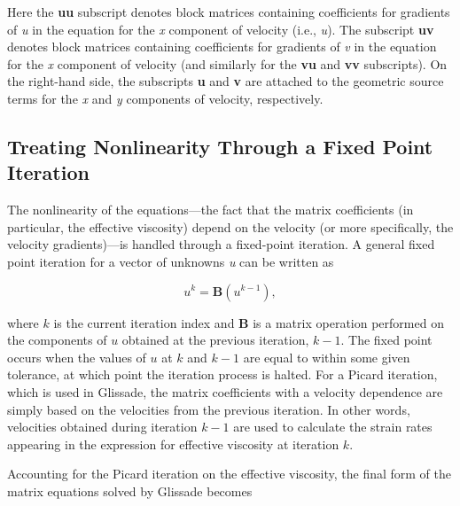 \noindent
Here the \textbf{uu} subscript denotes block matrices containing coefficients for gradients of \textit{u} in the equation for the \textit{x} component of velocity (i.e., \textit{u}). The subscript \textbf{uv} denotes block matrices containing coefficients for gradients of \textit{v} in the equation for the \textit{x} component of velocity (and similarly for the \textbf{vu} and \textbf{vv} subscripts). On the right-hand side, the subscripts \textbf{u} and \textbf{v} are attached to the geometric source terms for the \textit{x} and \textit{y} components of velocity, respectively.

\subsection{Treating Nonlinearity Through a Fixed Point Iteration}
The nonlinearity of the equations---the fact that the matrix coefficients (in particular, the effective viscosity) depend
on the velocity (or more specifically, the velocity gradients)---is handled through a fixed-point iteration. 
A general fixed point iteration for a vector of unknowns \textit{u} can be written as 

\begin{equation}
  u^{k} = \mathbf{B}\left( u^{k-1} \right),
\end{equation}

\noindent
where $k$ is the current iteration index and \textbf{B} is a matrix operation performed on the components of $u$ obtained at the previous iteration, $k-1$. The fixed point occurs when the values of $u$ at $k$ and $k-1$ are equal to within some given tolerance, at which point the iteration process is halted. %
For a Picard iteration, which is used in Glissade, the matrix coefficients with a velocity dependence are simply based on the velocities from the previous iteration. In other words, velocities obtained during iteration $k-1$ are used to calculate the strain rates appearing in the expression for effective viscosity at iteration $k$.

Accounting for %
the Picard iteration on the effective viscosity, the final form of the matrix equations solved by Glissade becomes 

